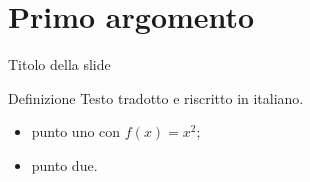 \section{Primo argomento}

\begin{frame}{Titolo della slide}
  \begin{block}{Definizione}
    Testo tradotto e riscritto in italiano.
  \end{block}
  \begin{itemize}
    \item punto uno con $f(x)=x^2$;
    \item punto due.
  \end{itemize}
\end{frame}
